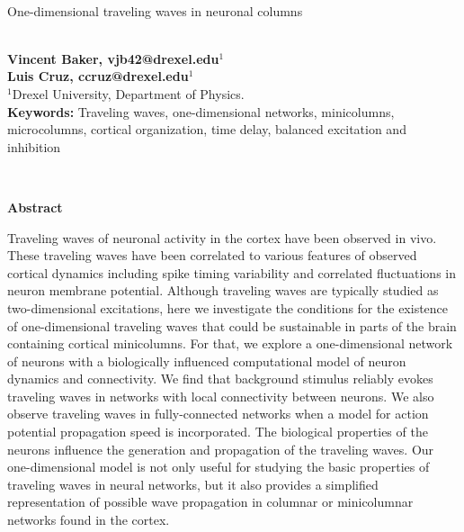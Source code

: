 \documentclass[12pt]{article}
\begin{document}
\hspace{13.9cm}

\ \vspace{20mm}\\

{\LARGE One-dimensional traveling waves in neuronal columns}

\ \\
{\bf \large Vincent Baker, vjb42@drexel.edu$^{\displaystyle 1}$}\\
{\bf \large Luis Cruz, ccruz@drexel.edu$^{\displaystyle 1}$}\\
{$^{\displaystyle 1}$Drexel University, Department of Physics.}\\
%

{\bf Keywords:} Traveling waves, one-dimensional networks, minicolumns, microcolumns, cortical organization, time delay, balanced excitation and inhibition

\thispagestyle{empty}
%
\ \vspace{-0mm}\\
%
\begin{center} {\bf Abstract} \end{center}
Traveling waves of neuronal activity in the cortex have been observed in vivo.
These traveling waves have been correlated to various features of observed cortical dynamics including spike timing variability and correlated fluctuations in neuron membrane potential.
Although traveling waves are typically studied as two-dimensional excitations, here we investigate the conditions for the existence of one-dimensional traveling waves that could be sustainable in parts of the brain containing cortical minicolumns.
For that, we explore a one-dimensional network of neurons with a biologically influenced computational model of neuron dynamics and connectivity.
We find that background stimulus reliably evokes traveling waves in networks with local connectivity between neurons.
We also observe traveling waves in fully-connected networks when a model for action potential propagation speed is incorporated.
The biological properties of the neurons influence the generation and propagation of the traveling waves. 
Our one-dimensional model is not only useful for studying the basic properties of traveling waves in neural networks, but it also provides a simplified representation of possible wave propagation in columnar or minicolumnar networks found in the cortex.

\end{document}
